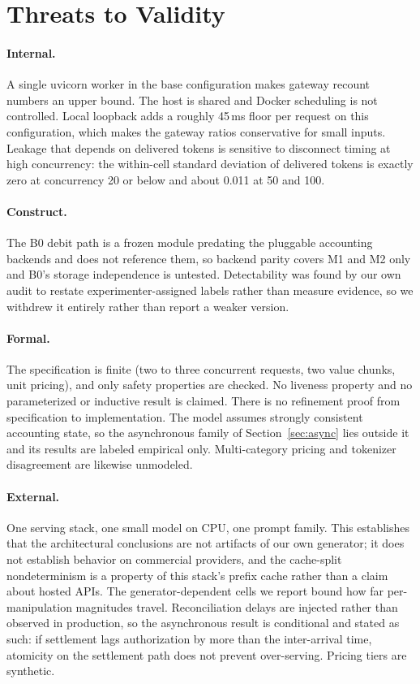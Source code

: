 \documentclass[preprint,3p,authoryear,12pt]{elsarticle}
\begin{document}
\section{Threats to Validity}
\label{sec:limits}
\paragraph{Internal.}
A single uvicorn worker in the base configuration makes gateway recount numbers an upper
bound. The host is shared and Docker scheduling is not controlled. Local loopback adds a
roughly 45\,ms floor per request on this configuration, which makes the gateway ratios
conservative for small inputs. Leakage that depends on delivered tokens is sensitive to
disconnect timing at high concurrency: the within-cell standard deviation of delivered
tokens is exactly zero at concurrency 20 or below and about 0.011 at 50 and 100.

\paragraph{Construct.}
The B0 debit path is a frozen module predating the pluggable accounting backends and
does not reference them, so backend parity covers M1 and M2 only and B0's storage
independence is untested. Detectability was found by our own audit to restate
experimenter-assigned labels rather than measure evidence, so we withdrew it entirely
rather than report a weaker version.

\paragraph{Formal.}
The specification is finite (two to three concurrent requests, two value chunks, unit
pricing), and only safety properties are checked. No liveness property and no
parameterized or inductive result is claimed. There is no refinement proof from
specification to implementation. The model assumes strongly consistent accounting state,
so the asynchronous family of Section~\ref{sec:async} lies outside it and its results are
labeled empirical only. Multi-category pricing and tokenizer disagreement are likewise
unmodeled.

\paragraph{External.}
One serving stack, one small model on CPU, one prompt family. This establishes that the
architectural conclusions are not artifacts of our own generator; it does not establish
behavior on commercial providers, and the cache-split nondeterminism is a property of
this stack's prefix cache rather than a claim about hosted APIs. The generator-dependent
cells we report bound how far per-manipulation magnitudes travel. Reconciliation delays
are injected rather than observed in production, so the asynchronous result is
conditional and stated as such: if settlement lags authorization by more than the
inter-arrival time, atomicity on the settlement path does not prevent over-serving.
Pricing tiers are synthetic.
\end{document}
